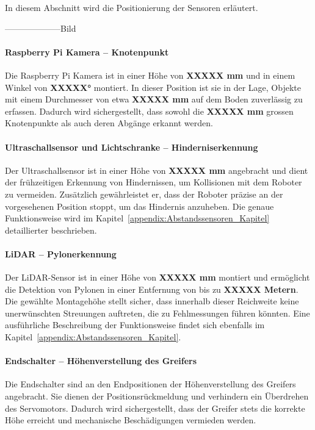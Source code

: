 \documentclass[main.tex]{subfiles} %
\begin{document}
In diesem Abschnitt wird die Positionierung der Sensoren erläutert.

--------------------Bild

\paragraph{Raspberry Pi Kamera – Knotenpunkt}

Die Raspberry Pi Kamera ist in einer Höhe von \textbf{XXXXX mm} und in einem Winkel von \textbf{XXXXX°} montiert.
In dieser Position ist sie in der Lage, Objekte mit einem Durchmesser von etwa \textbf{XXXXX mm} auf
dem Boden zuverlässig zu erfassen. Dadurch wird sichergestellt, dass sowohl die \textbf{XXXXX mm} grossen
Knotenpunkte als auch deren Abgänge erkannt werden.

\paragraph{Ultraschallsensor und Lichtschranke – Hinderniserkennung}

Der Ultraschallsensor ist in einer Höhe von \textbf{XXXXX mm} angebracht und dient der frühzeitigen
Erkennung von Hindernissen, um Kollisionen mit dem Roboter zu vermeiden. Zusätzlich gewährleistet er,
dass der Roboter präzise an der vorgesehenen Position stoppt, um das Hindernis anzuheben. Die genaue
Funktionsweise wird im Kapitel~\ref{appendix:Abstandssensoren_Kapitel} detaillierter beschrieben.

\paragraph{LiDAR – Pylonerkennung}

Der LiDAR-Sensor ist in einer Höhe von \textbf{XXXXX mm} montiert und ermöglicht die Detektion von
Pylonen in einer Entfernung von bis zu \textbf{XXXXX Metern}. Die gewählte Montagehöhe stellt sicher,
dass innerhalb dieser Reichweite keine unerwünschten Streuungen auftreten, die zu Fehlmessungen führen
könnten. Eine ausführliche Beschreibung der Funktionsweise findet sich ebenfalls im
Kapitel~\ref{appendix:Abstandssensoren_Kapitel}.

\paragraph{Endschalter – Höhenverstellung des Greifers}

Die Endschalter sind an den Endpositionen der Höhenverstellung des Greifers angebracht.
Sie dienen der Positionsrückmeldung und verhindern ein Überdrehen des Servomotors. Dadurch wird
sichergestellt, dass der Greifer stets die korrekte Höhe erreicht und mechanische Beschädigungen vermieden werden.
\end{document}
